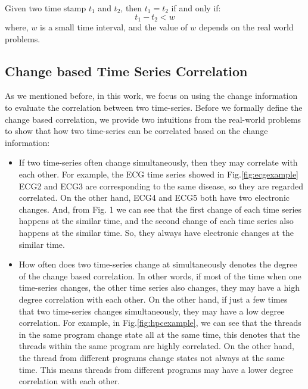 \begin{definition}
	Given two time stamp $t_1$ and $t_2$, then $t_1 = t_2$ if and only if:
	\begin{equation}
	t_1 - t_2 < w
	\end{equation}
	where, $w$ is a small time interval, and the value of $w$ depends on the real world problems.
\end{definition}

\subsection{Change based Time Series Correlation}

As we mentioned before, in this work, we focus on using the change information to evaluate the correlation between two time-series. 
Before we formally define the change based correlation, we provide two intuitions from the real-world problems to show that how two time-series can be correlated based on the change information:

\begin{itemize}
	\item If two time-series often change simultaneously, then they may correlate with each other. 
	For example, the ECG time series showed in Fig.\ref{fig:ecgexample} 
	ECG2 and ECG3 are corresponding to the same disease, so they are regarded correlated. On the other hand, ECG4 and ECG5 both have two electronic changes. And, from Fig. 1 we can see that the first change of each time series happens at the similar time, and the second change of each time series also happens at the similar time. So, they always have electronic changes at the similar time.
	\item How often does two time-series change at simultaneously denotes the degree of the change based correlation. 
	In other words, if most of the time when one time-series changes, the other time series also changes, they may have a high degree correlation with each other. On the other hand, if just a few times that two time-series changes simultaneously, they may have a low degree correlation.
	For example, in Fig.\ref{fig:hpcexample}, we can see that the threads in the same program change state all at the same time, this denotes that the threads within the same program are highly correlated. On the other hand, the thread from different programs change states not always at the same time. This means threads from different programs may have a lower degree correlation with each other.
\end{itemize}

